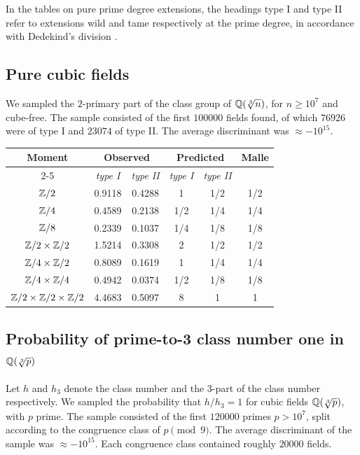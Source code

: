 \documentclass[11pt,a4paper]{amsart}
\def\Z{{\rm \mathbb{Z}}}
\def\Q{{\rm \mathbb{Q}}}
\numberwithin{equation}{section}
\begin{document}
In the tables on pure prime degree extensions, the headings type I and type II refer to extensions wild and tame respectively at the prime degree, in accordance with Dedekind's division \cite{Dedekind1900}. 


\subsection{Pure cubic fields} \label{tbl: pure cubic fields}

We sampled the $2$-primary part of the class group of $\Q(\sqrt[3]{n})$, for $n \geq 10^7$ and cube-free.  The sample consisted of the first $100000$ fields found, of which $76926$ were of type I and $23074$ of type II. The average discriminant was $\approx -10^{15}$.  \\

\begin{center}
\begin{tabular}{|c|c||c|c||c|c|}\hline
\multirow{2}{*}{\textbf{Moment}} & \multicolumn{2}{c|}{\textbf{Observed}} & \multicolumn{2}{c|}{\textbf{Predicted}} & \multirow{2}{*}{\textbf{Malle}} \\ \cline{2-5}
& \textit{type I} & \textit{type II} & \textit{type I} & \textit{type II} &  \\ \hline 
$\Z/2$ & 0.9118 & 0.4288 & \cellcolor{lightgray} 1 &  1/2 & 1/2 \\ \hline 
$\Z/4$ & 0.4589 & 0.2138 & 1/2 & 1/4 & 1/4 \\ \hline
$\Z/8$ & 0.2339 & 0.1037 & 1/4 & 1/8 & 1/8 \\ \hline
$\Z/2 \times \Z/2$ & 1.5214 & 0.3308 & \cellcolor{lightgray} 2 & 1/2 & 1/2 \\ \hline
$\Z/4 \times \Z/2$ & 0.8089 & 0.1619 & 1  & 1/4 & 1/4 \\ \hline
$\Z/4 \times \Z/4$ & 0.4942 & 0.0374 & 1/2 & 1/8 & 1/8 \\ \hline
$\Z/2 \times \Z/2 \times \Z/2$ & 4.4683 & 0.5097 & \cellcolor{lightgray} 8 &  1 & 1 \\ \hline
\end{tabular}
\end{center}

\subsection{Probability of prime-to-3 class number one in $\Q(\sqrt[3]{p})$} 
\label{tbl: probability of h/h3 equal to 1}

Let $h$ and $h_3$ denote the class number and the $3$-part of the class number respectively. We sampled the probability that $h/h_3 = 1$ for cubic fields  $\Q(\sqrt[3]{p})$, with $p$ prime. The sample consisted of the first $120000$ primes $p > 10^7$, split according to the congruence class of $p \pmod{9}$. The average discriminant of the sample was $\approx -10^{15}$. Each congruence class contained roughly $20000$ fields.
\end{document}
